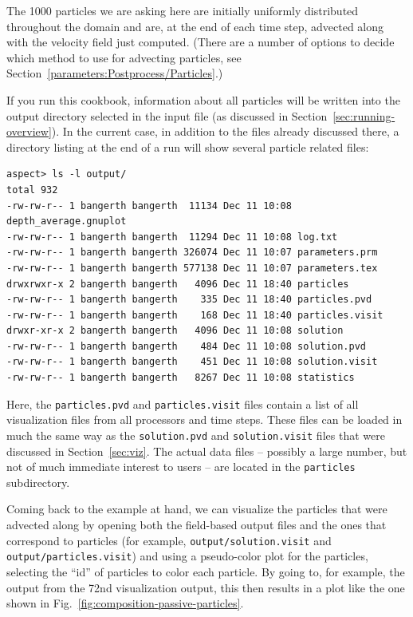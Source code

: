 \documentclass{article}
\begin{document}


The 1000 particles we are asking here are initially uniformly distributed
throughout the domain and are, at the end of each time step, advected along with
the velocity field just computed. (There are a number of options to decide which
method to use for advecting particles, see
Section~\ref{parameters:Postprocess/Particles}.) 

If you run this cookbook, information about all particles will be written into
the output directory selected in the input file (as discussed in
Section~\ref{sec:running-overview}). In the current case, in addition to the
files already discussed there, a directory listing at the end of a run will show
several particle related files:
\begin{lstlisting}[frame=single,language=ksh]
aspect> ls -l output/
total 932
-rw-rw-r-- 1 bangerth bangerth  11134 Dec 11 10:08 depth_average.gnuplot
-rw-rw-r-- 1 bangerth bangerth  11294 Dec 11 10:08 log.txt
-rw-rw-r-- 1 bangerth bangerth 326074 Dec 11 10:07 parameters.prm
-rw-rw-r-- 1 bangerth bangerth 577138 Dec 11 10:07 parameters.tex
drwxrwxr-x 2 bangerth bangerth   4096 Dec 11 18:40 particles
-rw-rw-r-- 1 bangerth bangerth    335 Dec 11 18:40 particles.pvd
-rw-rw-r-- 1 bangerth bangerth    168 Dec 11 18:40 particles.visit
drwxr-xr-x 2 bangerth bangerth   4096 Dec 11 10:08 solution
-rw-rw-r-- 1 bangerth bangerth    484 Dec 11 10:08 solution.pvd
-rw-rw-r-- 1 bangerth bangerth    451 Dec 11 10:08 solution.visit
-rw-rw-r-- 1 bangerth bangerth   8267 Dec 11 10:08 statistics
\end{lstlisting}
Here, the \texttt{particles.pvd} and \texttt{particles.visit} files contain
a list of all visualization files from all processors and time steps. These
files can be loaded in much the same way as the \texttt{solution.pvd} and
\texttt{solution.visit} files that were discussed in Section~\ref{sec:viz}. The
actual data files -- possibly a large number, but not of much immediate interest
to users -- are located in the \texttt{particles} subdirectory.

Coming back to the example at hand, we can visualize the particles that
were advected along by opening both the field-based output files and the ones
that correspond to particles (for example, \texttt{output/solution.visit} and
\texttt{output/particles.visit}) and using a pseudo-color plot
for the particles, selecting the ``id'' of particles to color each particle.
By going to, for example, the output from the 72nd visualization output, this
then results in a plot like the one shown in
Fig.~\ref{fig:composition-passive-particles}.
\end{document}
